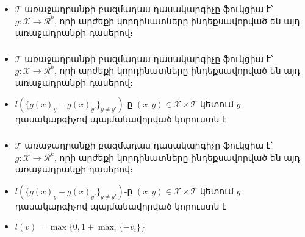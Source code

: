 \documentclass[10pt]{beamer}
\begin{document}
\begin{frame}[t]
\frametitle{}
\end{frame}


\begin{frame}[t]
\frametitle{}
\begin{itemize}
\vspace{5mm}
\item \armfont $\mathcal{T}$ առաջադրանքի բազմադաս դասակարգիչը ֆուկցիա է՝ $g:\mathcal{X} \rightarrow \mathcal{R}^{k}$, որի արժեքի կորդինատները ինդեքսավորված են այդ առաջադրանքի դասերով։
\end{itemize}
\end{frame}


\begin{frame}[t]
\frametitle{}
\begin{itemize}
\vspace{5mm}
\item \armfont $\mathcal{T}$ առաջադրանքի բազմադաս դասակարգիչը ֆուկցիա է՝ $g:\mathcal{X} \rightarrow \mathcal{R}^{k}$, որի արժեքի կորդինատները ինդեքսավորված են այդ առաջադրանքի դասերով։

\item $l(\{ g(x)_y-g(x)_{y'}\}_{y \neq y'}  )$-ը $(x, y) \in \mathcal{X} \times \mathcal{T}$ կետում $g$ դասակարգիչով պայմանավորված կորուստն է
\end{itemize}
\end{frame}


\begin{frame}[t]
\frametitle{}
\begin{itemize}
\vspace{5mm}
\item \armfont $\mathcal{T}$ առաջադրանքի բազմադաս դասակարգիչը ֆուկցիա է՝ $g:\mathcal{X} \rightarrow \mathcal{R}^{k}$, որի արժեքի կորդինատները ինդեքսավորված են այդ առաջադրանքի դասերով։

\item $l(\{ g(x)_y-g(x)_{y'}\}_{y \neq y'}  )$-ը $(x, y) \in \mathcal{X} \times \mathcal{T}$ կետում $g$ դասակարգիչով պայմանավորված կորուստն է
\item $l(v) = \max\{0, 1+\max_{i}\{-v_i\}\} $
\end{itemize}
\end{frame}
\end{document}
